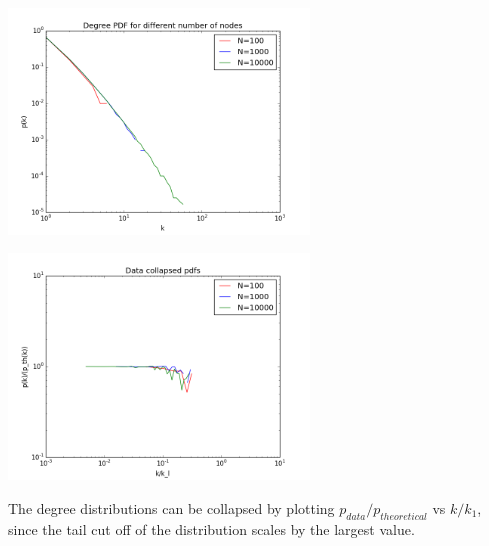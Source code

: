 \documentclass[twoside]{article}
\begin{document}
\begin{multicols}{2}
\begin{center}
  \includegraphics[height=60mm]{degree_dist_varying_N.png}
\end{center}
\begin{center}
  \includegraphics[height=60mm]{degree_dist_collapsed.png}
\end{center}
\end{multicols}
The degree distributions can be collapsed by plotting $p_{data}/p_{theoretical}$ vs $k/k_1$, since the tail cut off of the distribution scales by the largest value.
\end{document}
